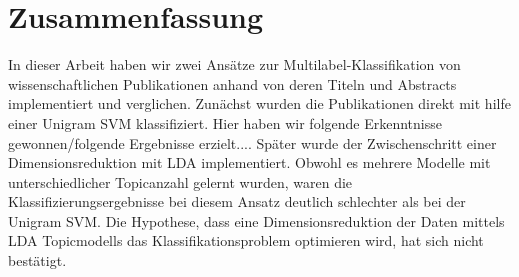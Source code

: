 \section{Zusammenfassung}

In dieser Arbeit haben wir zwei Ansätze zur Multilabel-Klassifikation von wissenschaftlichen Publikationen anhand von deren Titeln und Abstracts implementiert und verglichen.
Zunächst wurden die Publikationen direkt mit hilfe einer Unigram SVM klassifiziert.
Hier haben wir folgende Erkenntnisse gewonnen/folgende Ergebnisse erzielt....
Später wurde der Zwischenschritt einer Dimensionsreduktion mit LDA implementiert.
Obwohl es mehrere Modelle mit unterschiedlicher Topicanzahl gelernt wurden, waren die Klassifizierungsergebnisse bei diesem Ansatz deutlich schlechter als bei der Unigram SVM.
Die Hypothese, dass eine Dimensionsreduktion der Daten mittels LDA Topicmodells das Klassifikationsproblem optimieren wird, hat sich nicht bestätigt.

